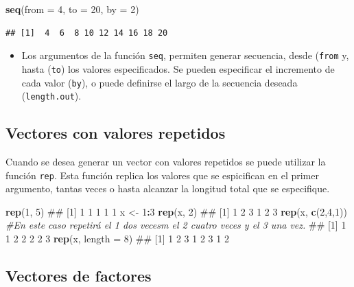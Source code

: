 \documentclass[]{book}
\newenvironment{Shaded}{\begin{snugshade}}{\end{snugshade}}
\newcommand{\KeywordTok}[1]{\textcolor[rgb]{0.13,0.29,0.53}{\textbf{#1}}}
\newcommand{\DataTypeTok}[1]{\textcolor[rgb]{0.13,0.29,0.53}{#1}}
\newcommand{\DecValTok}[1]{\textcolor[rgb]{0.00,0.00,0.81}{#1}}
\newcommand{\StringTok}[1]{\textcolor[rgb]{0.31,0.60,0.02}{#1}}
\newcommand{\CommentTok}[1]{\textcolor[rgb]{0.56,0.35,0.01}{\textit{#1}}}
\newcommand{\OperatorTok}[1]{\textcolor[rgb]{0.81,0.36,0.00}{\textbf{#1}}}
\newcommand{\NormalTok}[1]{#1}
\newenvironment{rmdblock}[1]
{\begin{shaded*}
		\begin{itemize}
			\renewcommand{\labelitemi}{
				\raisebox{-.7\height}[0pt][0pt]{
					{\setkeys{Gin}{width=3em,keepaspectratio}\texttt{[image: images/\#1]}}
				}
			}
			\item
		}
		{
		\end{itemize}
	\end{shaded*}
}
\newenvironment{rmdnote}
{\begin{rmdblock}{note}}
	{\end{rmdblock}}
\begin{document}
\begin{Shaded}
\begin{Highlighting}[]
\KeywordTok{seq}\NormalTok{(}\DataTypeTok{from =} \DecValTok{4}\NormalTok{, }\DataTypeTok{to =} \DecValTok{20}\NormalTok{, }\DataTypeTok{by =} \DecValTok{2}\NormalTok{)}
\end{Highlighting}
\end{Shaded}

\begin{verbatim}
## [1]  4  6  8 10 12 14 16 18 20
\end{verbatim}

\begin{rmdnote}
Los argumentos de la función \texttt{seq}, permiten generar secuencia,
desde (\texttt{from} y, hasta (\texttt{to}) los valores especificados.
Se pueden especificar el incremento de cada valor (\texttt{by}), o puede
definirse el largo de la secuencia deseada (\texttt{length.out}).
\end{rmdnote}

\hypertarget{vectores-con-valores-repetidos}{%
\subsection{Vectores con valores
repetidos}\label{vectores-con-valores-repetidos}}

Cuando se desea generar un vector con valores repetidos se puede
utilizar la función \texttt{rep}. Esta función replica los valores que
se espicifican en el primer argumento, tantas veces o hasta alcanzar la
longitud total que se especifique.

\begin{Shaded}
\begin{Highlighting}[]
\KeywordTok{rep}\NormalTok{(}\DecValTok{1}\NormalTok{, }\DecValTok{5}\NormalTok{)}
\NormalTok{## [1] 1 1 1 1 1}
\NormalTok{x <-}\StringTok{ }\DecValTok{1}\OperatorTok{:}\DecValTok{3}
\KeywordTok{rep}\NormalTok{(x, }\DecValTok{2}\NormalTok{)}
\NormalTok{## [1] 1 2 3 1 2 3}
\KeywordTok{rep}\NormalTok{(x, }\KeywordTok{c}\NormalTok{(}\DecValTok{2}\NormalTok{,}\DecValTok{4}\NormalTok{,}\DecValTok{1}\NormalTok{)) }\CommentTok{#En este caso repetirá el 1 dos vecesm el 2 cuatro veces y el 3 una vez.}
\NormalTok{## [1] 1 1 2 2 2 2 3}
\KeywordTok{rep}\NormalTok{(x, }\DataTypeTok{length =} \DecValTok{8}\NormalTok{)}
\NormalTok{## [1] 1 2 3 1 2 3 1 2}
\end{Highlighting}
\end{Shaded}

\hypertarget{vectores-de-factores}{%
\subsection{Vectores de factores}\label{vectores-de-factores}}
\end{document}
